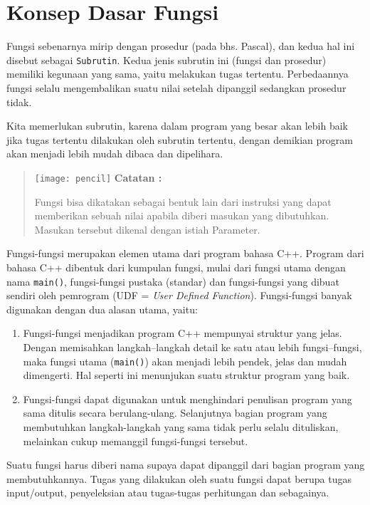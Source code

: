 \section{Konsep Dasar Fungsi}\label{konsep-dasar-fungsi}

Fungsi sebenarnya mirip dengan prosedur (pada bhs. Pascal), dan kedua
hal ini disebut sebagai \texttt{Subrutin}. Kedua jenis subrutin ini
(fungsi dan prosedur) memiliki kegunaan yang sama, yaitu melakukan tugas
tertentu. Perbedaannya fungsi selalu mengembalikan suatu nilai setelah
dipanggil sedangkan prosedur tidak.

Kita memerlukan subrutin, karena dalam program yang besar akan lebih
baik jika tugas tertentu dilakukan oleh subrutin tertentu, dengan
demikian program akan menjadi lebih mudah dibaca dan dipelihara.
\begin{quotation}
\texttt{[image: pencil]}	\textbf{Catatan :}
	
	Fungsi bisa dikatakan sebagai bentuk
	lain dari instruksi yang dapat memberikan sebuah nilai apabila diberi
	masukan yang dibutuhkan. Masukan tersebut dikenal dengan istiah
	Parameter.
\end{quotation}
 

Fungsi-fungsi merupakan elemen utama dari program bahasa C++. Program
dari bahasa C++ dibentuk dari kumpulan fungsi, mulai dari fungsi utama
dengan nama \texttt{main()}, fungsi-fungsi pustaka (standar) dan
fungsi-fungsi yang dibuat sendiri oleh pemrogram (UDF = \emph{User
Defined Function}). Fungsi-fungsi banyak digunakan dengan dua alasan
utama, yaitu:

\begin{enumerate}

\item
  Fungsi-fungsi menjadikan program C++ mempunyai struktur yang jelas.
  Dengan memisahkan langkah--langkah detail ke satu atau lebih
  fungsi--fungsi, maka fungsi utama (\texttt{main()}) akan menjadi lebih
  pendek, jelas dan mudah dimengerti. Hal seperti ini menunjukan suatu
  struktur program yang baik.
\item
  Fungsi-fungsi dapat digunakan untuk menghindari penulisan program yang
  sama ditulis secara berulang-ulang. Selanjutnya bagian program yang
  membutuhkan langkah-langkah yang sama tidak perlu selalu dituliskan,
  melainkan cukup memanggil fungsi-fungsi tersebut.
\end{enumerate}

Suatu fungsi harus diberi nama supaya dapat dipanggil dari bagian
program yang membutuhkannya. Tugas yang dilakukan oleh suatu fungsi
dapat berupa tugas input/output, penyeleksian atau tugas-tugas
perhitungan dan sebagainya.

